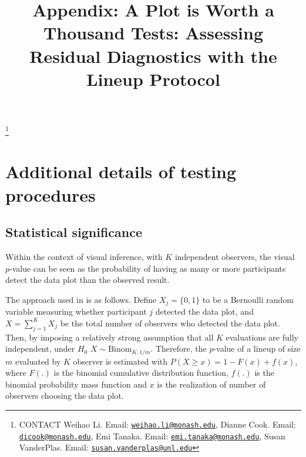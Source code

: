\documentclass[]{interact}
\theoremstyle{plain}%
\theoremstyle{definition}
\theoremstyle{remark}
\begin{document}
\articletype{}

\title{Appendix: A Plot is Worth a Thousand Tests: Assessing Residual
Diagnostics with the Lineup Protocol}


\author{
}

\thanks{CONTACT Weihao
Li. Email: \href{mailto:weihao.li@monash.edu}{\nolinkurl{weihao.li@monash.edu}}, Dianne
Cook. Email: \href{mailto:dicook@monash.edu}{\nolinkurl{dicook@monash.edu}}, Emi
Tanaka. Email: \href{mailto:emi.tanaka@monash.edu}{\nolinkurl{emi.tanaka@monash.edu}}, Susan
VanderPlas. Email: \href{mailto:susan.vanderplas@unl.edu}{\nolinkurl{susan.vanderplas@unl.edu}}}

\maketitle



\appendix

\hypertarget{additional-details-of-testing-procedures}{%
\section{Additional details of testing
procedures}\label{additional-details-of-testing-procedures}}

\hypertarget{statistical-significance}{%
\subsection{Statistical significance}\label{statistical-significance}}

Within the context of visual inference, with \(K\) independent
observers, the visual \(p\)-value can be seen as the probability of
having as many or more participants detect the data plot than the
observed result.

The approach used in \citet{majumder2013validation} is as follows.
Define \(X_j = \{0,1\}\) to be a Bernoulli random variable measuring
whether participant \(j\) detected the data plot, and
\(X = \sum_{j=1}^{K}X_j\) be the total number of observers who detected
the data plot. Then, by imposing a relatively strong assumption that all
\(K\) evaluations are fully independent, under \(H_0\)
\(X \sim \mathrm{Binom}_{K,1/m}\). Therefore, the \(p\)-value of a
lineup of size \(m\) evaluated by \(K\) observer is estimated with
\(P(X \geq x) = 1 - F(x) + f(x)\), where \(F(.)\) is the binomial
cumulative distribution function, \(f(.)\) is the binomial probability
mass function and \(x\) is the realization of number of observers
choosing the data plot.
\end{document}
